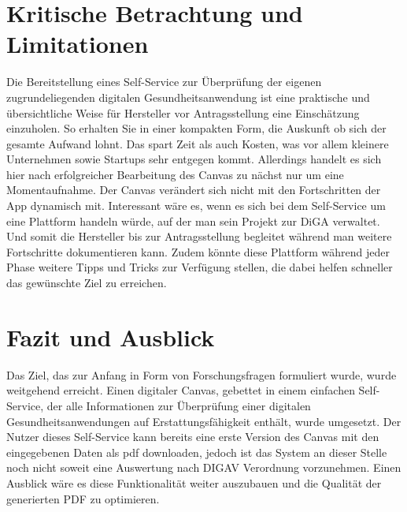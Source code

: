 \section{Kritische Betrachtung und Limitationen}
Die Bereitstellung eines Self-Service zur Überprüfung der eigenen zugrundeliegenden digitalen Gesundheitsanwendung ist eine praktische und übersichtliche Weise für Hersteller vor Antragsstellung eine Einschätzung einzuholen. So erhalten Sie in einer kompakten Form, die Auskunft ob sich der gesamte Aufwand lohnt. Das spart Zeit als auch Kosten, was vor allem kleinere Unternehmen sowie Startups sehr entgegen kommt. Allerdings handelt es sich hier nach erfolgreicher Bearbeitung des Canvas zu nächst nur um eine Momentaufnahme. Der Canvas verändert sich nicht mit den Fortschritten der App dynamisch mit. Interessant wäre es, wenn es sich bei dem Self-Service um eine Plattform handeln würde, auf der man sein Projekt zur DiGA verwaltet. Und somit die Hersteller bis zur Antragsstellung begleitet während man weitere Fortschritte dokumentieren kann. Zudem könnte diese Plattform während jeder Phase weitere Tipps und Tricks zur Verfügung stellen, die dabei helfen schneller das gewünschte Ziel zu erreichen.
\section{Fazit und Ausblick}
Das Ziel, das zur Anfang in Form von Forschungsfragen formuliert wurde, wurde weitgehend erreicht. Einen digitaler Canvas, gebettet in einem einfachen Self-Service, der alle Informationen zur Überprüfung einer digitalen Gesundheitsanwendungen auf Erstattungsfähigkeit enthält, wurde umgesetzt. Der Nutzer dieses Self-Service kann bereits eine erste Version des Canvas mit den eingegebenen Daten als pdf downloaden, jedoch ist das System an dieser Stelle noch nicht soweit eine Auswertung nach DIGAV Verordnung vorzunehmen. Einen Ausblick wäre es diese Funktionalität weiter auszubauen und die Qualität der generierten PDF zu optimieren.
